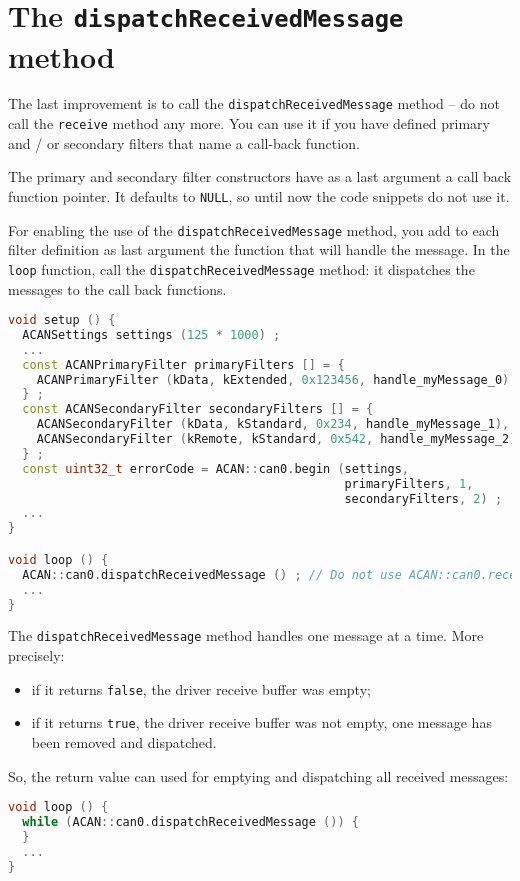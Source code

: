 \documentclass[10pt, a4paper, obeyspaces, openany]{extarticle}
\newcommand \sectionLabel[2]{\section{#1}\label{sec:#2}}
\begin{document}
\sectionLabel{The \texttt{dispatchReceivedMessage} method}{UsingDispatchMethod}

The last improvement is to call the \texttt{dispatchReceivedMessage} method -- do not call the \texttt{receive} method any more. You can use it if you have defined primary and / or secondary filters that name a call-back function.

The primary and secondary filter constructors have as a last argument a call back function pointer. It defaults to \texttt{NULL}, so until now the code snippets do not  use it.

For enabling the use of the \texttt{dispatchReceivedMessage} method, you add to each filter definition as last argument the function that will handle the message. In the \texttt{loop} function, call the \texttt{dispatchReceivedMessage} method: it dispatches the messages to the call back functions.

{ \small\begin{lstlisting}[language=c++]
void setup () {
  ACANSettings settings (125 * 1000) ;
  ...
  const ACANPrimaryFilter primaryFilters [] = {
    ACANPrimaryFilter (kData, kExtended, 0x123456, handle_myMessage_0)
  } ;
  const ACANSecondaryFilter secondaryFilters [] = {
    ACANSecondaryFilter (kData, kStandard, 0x234, handle_myMessage_1),
    ACANSecondaryFilter (kRemote, kStandard, 0x542, handle_myMessage_2)
  } ;
  const uint32_t errorCode = ACAN::can0.begin (settings,
                                               primaryFilters, 1,
                                               secondaryFilters, 2) ;
  ...
}

void loop () {
  ACAN::can0.dispatchReceivedMessage () ; // Do not use ACAN::can0.receive any more
  ...
}
\end{lstlisting}}

The \texttt{dispatchReceivedMessage} method handles one message at a time. More precisely:
\begin{itemize}
  \item if it returns \texttt{false}, the driver receive buffer was empty;
  \item if it returns \texttt{true}, the driver receive buffer was not empty, one message has been removed and dispatched.
\end{itemize}

So, the return value can used for emptying and dispatching all received messages:
{ \small\begin{lstlisting}[language=c++]
void loop () {
  while (ACAN::can0.dispatchReceivedMessage ()) {
  }
  ...
}
\end{lstlisting}}
\end{document}
